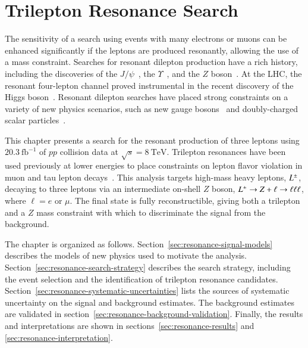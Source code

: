 \chapter{Trilepton Resonance Search}\label{ch:trilepton-resonance-search}
The sensitivity of a search using events with many electrons or muons can be enhanced significantly if the leptons are produced resonantly, allowing the use of a mass constraint. Searches for resonant dilepton production have a rich history, including the discoveries of the $J/\psi$~\cite{jpsi1,jpsi2}, the $\Upsilon$~\cite{upsilon}, and the $Z$ boson~\cite{zua1}. At the LHC, the resonant four-lepton channel proved instrumental in the recent discovery of the Higgs boson~\cite{TheATLASCollaboration:2012cp,TheCMSCollaboration:2012dl}. Resonant dilepton searches have placed strong constraints on a variety of new physics scenarios, such as new gauge bosons~\cite{TheATLASCollaboration:2014eb,TheCMSCollaboration:2015fm} and doubly-charged scalar particles~\cite{TheATLASCollaboration:2015gu}. 

This chapter presents a search for the resonant production of three leptons using $20.3~\mbox{fb}^{-1}$ of $pp$ collision data at $\sqrt{s}=8~\mbox{TeV}$. Trilepton resonances have been used previously at lower energies to place constraints on lepton flavor violation in muon and tau lepton decays~\cite{Bellgardt:1987du,taulll}. This analysis targets high-mass heavy leptons, $L^{\pm}$, decaying to three leptons via an intermediate on-shell $Z$ boson, $L^{\pm} \rightarrow Z+\ell \rightarrow \ell\ell\ell$, where $\ell=e$ or $\mu$. The final state is fully reconstructible, giving both a trilepton and a $Z$ mass constraint with which to discriminate the signal from the background.

The chapter is organized as follows. Section~\ref{sec:resonance-signal-models} describes the models of new physics used to motivate the analysis. Section~\ref{sec:resonance-search-strategy} describes the search strategy, including the event selection and the identification of trilepton resonance candidates. Section~\ref{sec:resonance-systematic-uncertainties} lists the sources of systematic uncertainty on the signal and background estimates. The background estimates are validated in section~\ref{sec:resonance-background-validation}. Finally, the results and interpretations are shown in sections~\ref{sec:resonance-results} and \ref{sec:resonance-interpretation}. 

